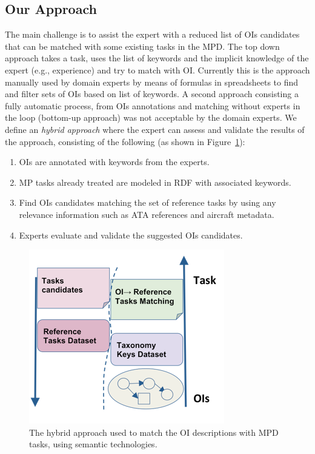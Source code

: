 \documentclass[runningheads,a4paper]{{llncs}}
\begin{document}
\subsection{Our Approach}
\label{sec:approach}
The main challenge is to assist the expert with a reduced list of OIs candidates that can be matched with some existing tasks in the MPD. The top down approach takes a task, uses the list of keywords and the implicit knowledge of the expert (e.g., experience) and try to match with OI. Currently this is the approach manually used by domain experts by means of formulas in spreadsheets to find and filter sets of OIs based on list of keywords. A second approach consisting a fully automatic process, from OIs annotations and matching without experts in the loop (bottom-up approach) was not acceptable by the domain experts. We define an \textit{hybrid approach} where the expert can assess and validate the results of the approach, consisting of the following (as shown in Figure~\ref{fig:approach}):
\begin{enumerate}
\item OIs are annotated with keywords from the experts.
\item MP tasks already treated are modeled in RDF with associated keywords.
\item Find OIs candidates matching the set of reference tasks by using any relevance information such as ATA references and aircraft metadata.
\item Experts evaluate and validate the suggested OIs candidates.
\end{enumerate}  

\begin{figure}[!htb]
\centering
\includegraphics[scale=0.6]{img/ourapproach.png}
\caption{The hybrid approach used to match the OI descriptions with MPD tasks, using semantic technologies.}
\label{fig:approach}
\end{figure}
\end{document}
